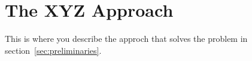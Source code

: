 \section{The XYZ Approach}

This is where you describe the approch that solves the problem in section~\ref{sec:preliminaries}.
